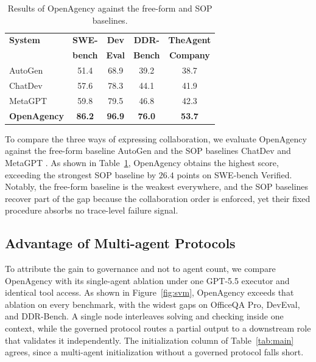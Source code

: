 \documentclass{article} %
\begin{document}
\begin{table}
\vspace{-4mm}
\caption{Results of OpenAgency against the free-form and SOP baselines.}
\vspace{2mm}
\label{tab:free_form}
\centering
\small
\setlength{\tabcolsep}{2.5pt}
\begin{tabular}{lcccc}
\toprule
\textbf{System} & \textbf{SWE-} & \textbf{Dev} & \textbf{DDR-} & \textbf{TheAgent} \\
 & \textbf{bench} & \textbf{Eval} & \textbf{Bench} & \textbf{Company} \\
\midrule
AutoGen & 51.4 & 68.9 & 39.2 & 38.7 \\
ChatDev & 57.6 & 78.3 & 44.1 & 41.9 \\
MetaGPT & 59.8 & 79.5 & 46.8 & 42.3 \\
\rowcolor{gray!12}
\textbf{OpenAgency} & \textbf{86.2} & \textbf{96.9} & \textbf{76.0} & \textbf{53.7} \\
\bottomrule
\end{tabular}
\end{table}
To compare the three ways of expressing collaboration, we evaluate OpenAgency against the free-form baseline AutoGen \citep{wu2023autogenenablingnextgenllm} and the SOP baselines ChatDev \citep{qian2024chatdevcommunicativeagentssoftware} and MetaGPT \citep{hong2024metagptmetaprogrammingmultiagent}. As shown in Table~\ref{tab:free_form}, OpenAgency obtains the highest score, exceeding the strongest SOP baseline by $26.4$ points on SWE-bench Verified. Notably, the free-form baseline is the weakest everywhere, and the SOP baselines recover part of the gap because the collaboration order is enforced, yet their fixed procedure absorbs no trace-level failure signal.

\subsection{Advantage of Multi-agent Protocols}
\label{sec:ablation_multi}

To attribute the gain to governance and not to agent count, we compare OpenAgency with its single-agent ablation under one GPT-5.5 executor and identical tool access. As shown in Figure~\ref{fig:svm}, OpenAgency exceeds that ablation on every benchmark, with the widest gaps on OfficeQA Pro, DevEval, and DDR-Bench. A single node interleaves solving and checking inside one context, while the governed protocol routes a partial output to a downstream role that validates it independently. The initialization column of Table~\ref{tab:main} agrees, since a multi-agent initialization without a governed protocol falls short.
\end{document}
